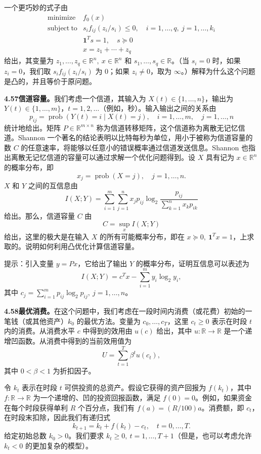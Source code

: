 \documentclass[UTF8, 12pt, fontset=fandol, oneside]{ctexart}
\begin{document}
一个更巧妙的式子由
\[
\begin{array}{ll}
\mathop{\mathrm{minimize}} & f_0(x)\\
\mathrm{subject\ to} & s_if_{ij}(z_i/s_i)\leq0,\quad i=1,\ldots,q,\ j=1,\ldots,k_i\\
& \mathbf{1}^Ts=1,\quad s\succeq0\\
& x=z_1+\cdots+z_q
\end{array}
\]
给出，其变量为 $z_1,\ldots,z_q\in\mathbb{R}^n,\ x\in\mathbb{R}^n$ 和 $s_1,\ldots,s_q\in\mathbb{R}$。（当 $s_i=0$ 时，如果 $z_i=0$，我们取 $s_if_{ij}(z_i/s_i)$ 为 0；如果 $z_i\neq0$，取为 $\infty$。）解释为什么这个问题是凸的，并且等价于原问题。

\noindent\textbf{4.57\quad 信道容量。}\quad 我们考虑一个信道，其输入为 $X(t)\in\{1,\ldots,n\}$，输出为 $Y(t)\in\{1,\ldots,m\}$，$t=1,2,\ldots$（例如，秒）。输入输出之间的关系由
\[
p_{ij}=\operatorname{prob}(Y(t)=i\mid X(t)=j),\quad i=1,\ldots,m,\quad j=1,\ldots,n
\]
统计地给出。矩阵 $P\in\mathbb{R}^{m\times n}$ 称为信道转移矩阵，这个信道称为离散无记忆信道。Shannon 一个著名的结论表明以比特每秒为单位，用小于被称为信道容量的数 $C$ 的任意速率，将能够以任意小的错误概率通过信道发送信息。Shannon 也指出离散无记忆信道的容量可以通过求解一个优化问题得到。设 $X$ 具有记为 $x\in\mathbb{R}^n$ 的概率分布，即
\[
x_j=\operatorname{prob}(X=j),\quad j=1,\ldots,n.
\]
$X$ 和 $Y$ 之间的互信息由
\[
I(X;Y)=\sum_{i=1}^m\sum_{j=1}^n x_jp_{ij}\log_2\frac{p_{ij}}{\sum_{k=1}^n x_kp_{ik}}
\]
给出。那么，信道容量 $C$ 由
\[
C=\sup_x I(X;Y)
\]
给出，这里的极大是在输入 $X$ 的所有可能概率分布，即在 $x\succeq0,\ \mathbf{1}^Tx=1$，上求取的。说明如何利用凸优化计算信道容量。

提示：引入变量 $y=Px$，它给出了输出 $Y$ 的概率分布，证明互信息可以表述为
\[
I(X;Y)=c^Tx-\sum_{i=1}^m y_i\log_2y_i,
\]
其中 $c_j=\sum_{i=1}^m p_{ij}\log_2p_{ij},\ j=1,\ldots,n$。

\noindent\textbf{4.58\quad 最优消费。}\quad 在这个问题中，我们考虑在一段时间内消费（或花费）初始的一笔钱（或其他资产）$k_0$ 的最优方法。变量为 $c_0,\ldots,c_T$，这里 $c_t\geq0$ 表示在时段 $t$ 内的消费。从消费水平 $c$ 中得到的效用由 $u(c)$ 给出，其中 $u:\mathbb{R}\to\mathbb{R}$ 是一个递增凹函数。从消费中得到的当前效用值为
\[
U=\sum_{t=1}^T\beta^tu(c_t),
\]
其中 $0<\beta<1$ 为折扣因子。

令 $k_t$ 表示在时段 $t$ 可供投资的总资产。假设它获得的资产回报为 $f(k_t)$，其中 $f:\mathbb{R}\to\mathbb{R}$ 为一个递增的、凹的投资回报函数，满足 $f(0)=0$。例如，如果资金在每个时段获得单利 $R$ 个百分点，我们有 $f(a)=(R/100)a$。消费额，即 $c_t$，在时段末扣除，因此我们有递归式
\[
k_{t+1}=k_t+f(k_t)-c_t,\quad t=0,\ldots,T.
\]
给定初始总数 $k_0>0$。我们要求 $k_t\geq0,\ t=1,\ldots,T+1$（但是，也可以考虑允许 $k_t<0$ 的更加复杂的模型）。
\end{document}
